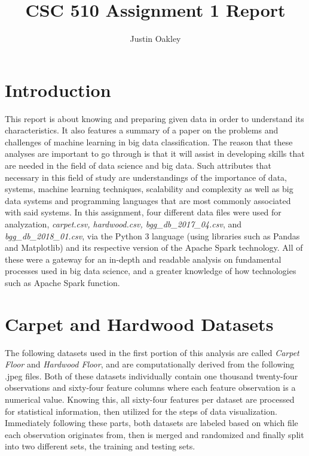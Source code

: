 \documentclass[a4paper,12pt]{IEEEtran}
\begin{document}
\title{CSC 510 Assignment 1 Report}
\author{Justin Oakley}
\maketitle

\tableofcontents
\newpage

\section{Introduction}
This report is about knowing and preparing given data in order to understand its characteristics. It also features a summary of a paper on the problems and challenges of machine learning in big data classification. The reason that these analyses are important to go through is that it will assist in developing skills that are needed in the field of data science and big data. Such attributes that necessary in this field of study are understandings of the importance of data, systems, machine learning techniques, scalability and complexity as well as big data systems and programming languages that are most commonly associated with said systems. In this assignment, four different data files were used for analyzation, \textit{carpet.csv, hardwood.csv, bgg\_db\_2017\_04.csv}, and \textit{bgg\_db\_2018\_01.csv}, via the Python 3 language (using libraries such as Pandas and Matplotlib) and its respective version of the Apache Spark technology. All of these were a gateway for an in-depth and readable analysis on fundamental processes used in big data science, and a greater knowledge of how technologies such as Apache Spark function.

\section{Carpet and Hardwood Datasets}
The following datasets used in the first portion of this analysis are called \textit{Carpet Floor} and \textit{Hardwood Floor}, and are computationally derived from the following .jpeg files. Both of these datasets individually contain one thousand twenty-four observations and sixty-four feature columns where each feature observation is a numerical value. Knowing this, all sixty-four features per dataset are processed for statistical information, then utilized for the steps of data visualization. Immediately following these parts, both datasets are labeled based on which file each observation originates from, then is merged and randomized and finally split into two different sets, the training and testing sets.
\end{document}
